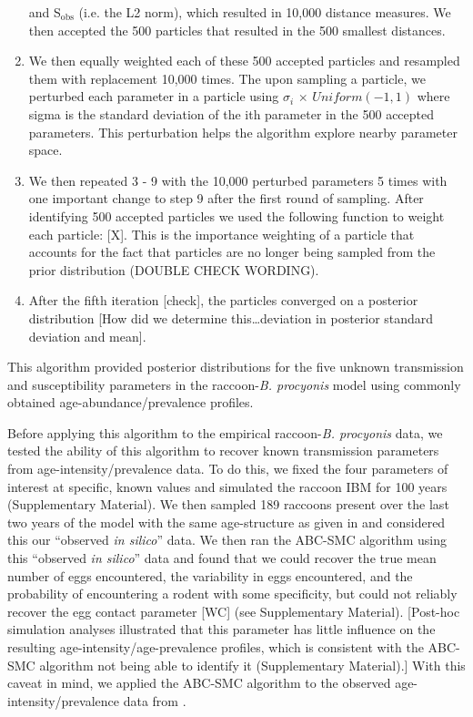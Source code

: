 \documentclass[11pt]{article}
\begin{document}
\begin{enumerate}
  and S$_\text{obs}$ (i.e. the L2 norm), which resulted in 10,000 distance
  measures. We then accepted the 500 particles that resulted in the
  500 smallest distances.
\item
  We then equally weighted each of these 500 accepted particles and
  resampled them with replacement 10,000 times. The upon sampling a
  particle, we perturbed each parameter in a particle using
 $\sigma_i$ $\times$ $Uniform(-1, 1)$ where sigma is the standard
  deviation of the ith parameter in the 500 accepted parameters. This
  perturbation helps the algorithm explore nearby parameter space.
\item
  We then repeated 3 - 9 with the 10,000 perturbed parameters 5
  times with one important change to step 9 after the first round of
  sampling. After identifying 500 accepted particles we used the
  following function to weight each particle: {[}X{]}. This is the
  importance weighting of a particle that accounts for the fact that
  particles are no longer being sampled from the prior distribution \citep{Beaumont2010}
  (DOUBLE CHECK WORDING).
\item
  After the fifth iteration {[}check{]}, the particles converged on a
  posterior distribution {[}How did we determine this\ldots{}deviation
  in posterior standard deviation and mean{]}.
\end{enumerate}

This algorithm provided posterior distributions for the five unknown
transmission and susceptibility parameters in the raccoon-\emph{B.
procyonis} model using commonly obtained age-abundance/prevalence
profiles.  

Before applying this algorithm to the empirical raccoon-\emph{B. procyonis} data, we tested the ability of this algorithm to recover known transmission parameters from age-intensity/prevalence data.  To do this, we fixed the four parameters of interest at specific, known values and simulated the raccoon IBM for 100 years (Supplementary Material).  We then sampled 189 raccoons present over the last two years of the model with the same age-structure as given in \cite{Weinstein2016} and considered this our ``observed \emph{in silico}'' data.  We then ran the ABC-SMC algorithm using this ``observed \emph{in silico}'' data and found that we could recover the true mean number of eggs encountered, the variability in eggs encountered, and the probability of encountering a rodent with some specificity, but could not reliably recover the egg contact parameter [WC] (see Supplementary Material). [Post-hoc simulation analyses illustrated that this parameter has little influence on the resulting age-intensity/age-prevalence profiles, which is consistent with the ABC-SMC algorithm not being able to identify it (Supplementary Material).] With this caveat in mind, we applied the ABC-SMC algorithm to the observed age-intensity/prevalence data from \cite{Weinstein2016}.
\end{document}
